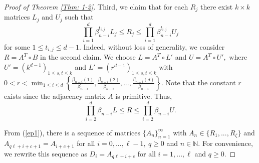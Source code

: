 \documentclass{amsart}
\theoremstyle{definition}
\begin{document}
\begin{proof}[Proof of Theorem \ref{Thm: 1-2}]
Third, we claim that for each $R_j$ there exist $k\times k$ matrices $L_j$ and $U_j$ such that 
\[
\prod_{i=1}^d\beta_{n-i}^{t_{i,j}}L_j\leq R_j\leq \prod_{i=1}^d\beta_{n-i}^{t_{i,j}} U_j
\]
for some $1\leq t_{i,j}\leq d-1.$ Indeed, without loss of generality, we consider $R=A^T\circ B$ in the second claim. We choose 
$L=A^T\circ L'$ and $U=A^T\circ U',$ where $U'=(k^{d-1})_{1\leq s,t\leq k}$ and $L'=(r^{d-1})_{1\leq s,t\leq k}$ with $0<r<\min_{1\leq i\leq d}\left\{\frac{\beta_{n-i}(1)}{\beta_{n-i}},\frac{\beta_{n-i}(2)}{\beta_{n-i}},...,\frac{\beta_{n-i}(d)}{\beta_{n-i}}\right\}.$ Note that the constant $r$ exists since the adjacency matrix $A$ is primitive. Thus,
\[
\prod_{i=2}^d \beta_{n-i}L\leq R\leq \prod_{i=2}^d \beta_{n-i} U. 
\]

From (\ref{ep1}), there is a sequence of matrices $\{A_n\}_{n=1}^\infty$ with $A_n\in \{R_1,...,R_{\zeta}\}$ and $A_{q\ell+i+c+1}=A_{i+c+1}$ for all $i=0,...,\ell-1,~q\geq 0$ and $n\in\mathbb{N}.$ For convenience, we rewrite this sequence as $D_i=A_{q\ell+i+c}$ for all $i=1,...,\ell$ and $q\geq 0.$ 


\end{proof}
\end{document}
